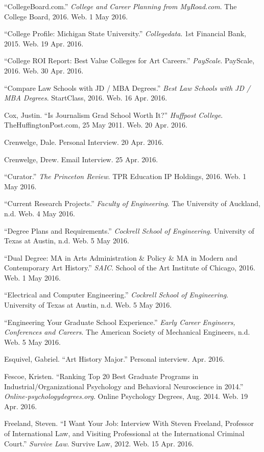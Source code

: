 \begin{workscited}
\begin{flushleft}
\bibent
“CollegeBoard.com.” \textit{College and Career Planning from MyRoad.com}. The College Board, 2016. Web. 1 May 2016.

\bibent
“College Profile: Michigan State University.” \textit{Collegedata}. 1st Financial Bank, 2015. Web. 19 Apr. 2016. 

\bibent
“College ROI Report: Best Value Colleges for Art Careers.” \textit{PayScale}. PayScale, 2016. Web. 30 Apr. 2016.

\bibent
“Compare Law Schools with JD / MBA Degrees.” \textit{Best Law Schools with JD / MBA Degrees}. StartClass, 2016. Web. 16 Apr. 2016.

\bibent
Cox, Justin. “Is Journalism Grad School Worth It?” \textit{Huffpost College}. TheHuffingtonPost.com, 25 May 2011. Web. 20 Apr. 2016.

\bibent
Crenwelge, Dale. Personal Interview. 20 Apr. 2016.

\bibent
Crenwelge, Drew. Email Interview. 25 Apr. 2016.

\bibent
“Curator.” \textit{The Princeton Review}. TPR Education IP Holdings, 2016. Web. 1 May 2016.

\bibent
“Current Research Projects.” \textit{Faculty of Engineering}. The University of Auckland, n.d. Web. 4 May 2016.

\bibent
“Degree Plans and Requirements.” \textit{Cockrell School of Engineering}. University of Texas at Austin, n.d. Web. 5 May 2016.

\bibent
“Dual Degree: MA in Arts Administration \& Policy \& MA in Modern and Contemporary Art History.” \textit{SAIC}. School of the Art Institute of Chicago, 2016. Web. 1 May 2016.

\bibent
“Electrical and Computer Engineering.” \textit{Cockrell School of Engineering}. University of Texas at Austin, n.d. Web. 5 May 2016.

\bibent
“Engineering Your Graduate School Experience.” \textit{Early Career Engineers, Conferences and Careers}. The American Society of Mechanical Engineers, n.d. Web. 5 May 2016.

\bibent
Esquivel, Gabriel. “Art History Major.” Personal interview. Apr. 2016.

\bibent
Fescoe, Kristen. “Ranking Top 20 Best Graduate Programs in Industrial/Organizational Psychology and Behavioral Neuroscience in 2014.” \textit{Online-psychologydegrees.org}. Online Psychology Degrees, Aug. 2014. Web. 19 Apr. 2016.

\bibent
Freeland, Steven. “I Want Your Job: Interview With Steven Freeland, Professor of International Law, and Visiting Professional at the International Criminal Court.” \textit{Survive Law}. Survive Law, 2012. Web. 15 Apr. 2016. 


\end{flushleft}
\end{workscited}
